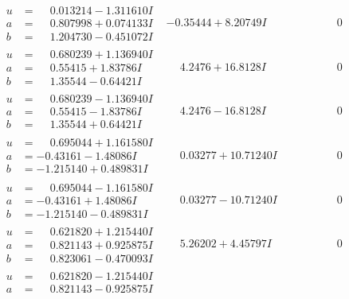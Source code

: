 \documentclass[1p]{elsarticle_modified}
\theoremstyle{definition}
\begin{document}
$$\begin{array}{c|c|c}
\begin{aligned}
u &= \phantom{-}0.013214 - 1.311610 I \\
a &= \phantom{-}0.807998 + 0.074133 I \\
b &= \phantom{-}1.204730 - 0.451072 I\end{aligned}
 & -0.35444 + 8.20749 I & \phantom{-0.000000 } 0 \\ \hline\begin{aligned}
u &= \phantom{-}0.680239 + 1.136940 I \\
a &= \phantom{-}0.55415 + 1.83786 I \\
b &= \phantom{-}1.35544 - 0.64421 I\end{aligned}
 & \phantom{-}4.2476 + 16.8128 I & \phantom{-0.000000 } 0 \\ \hline\begin{aligned}
u &= \phantom{-}0.680239 - 1.136940 I \\
a &= \phantom{-}0.55415 - 1.83786 I \\
b &= \phantom{-}1.35544 + 0.64421 I\end{aligned}
 & \phantom{-}4.2476 - 16.8128 I & \phantom{-0.000000 } 0 \\ \hline\begin{aligned}
u &= \phantom{-}0.695044 + 1.161580 I \\
a &= -0.43161 - 1.48086 I \\
b &= -1.215140 + 0.489831 I\end{aligned}
 & \phantom{-}0.03277 + 10.71240 I & \phantom{-0.000000 } 0 \\ \hline\begin{aligned}
u &= \phantom{-}0.695044 - 1.161580 I \\
a &= -0.43161 + 1.48086 I \\
b &= -1.215140 - 0.489831 I\end{aligned}
 & \phantom{-}0.03277 - 10.71240 I & \phantom{-0.000000 } 0 \\ \hline\begin{aligned}
u &= \phantom{-}0.621820 + 1.215440 I \\
a &= \phantom{-}0.821143 + 0.925875 I \\
b &= \phantom{-}0.823061 - 0.470093 I\end{aligned}
 & \phantom{-}5.26202 + 4.45797 I & \phantom{-0.000000 } 0 \\ \hline\begin{aligned}
u &= \phantom{-}0.621820 - 1.215440 I \\
a &= \phantom{-}0.821143 - 0.925875 I \\

\end{aligned}
\end{array}$$
\end{document}
